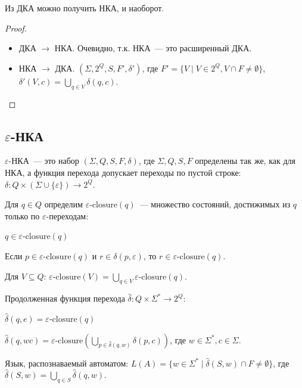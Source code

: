 \documentclass[12pt]{article}
\begin{document}
	\begin{statement}
		Из ДКА можно получить НКА, и наоборот.
	\end{statement}
	
	\begin{proof}
		\begin{itemize}
			\item ДКА $\rightarrow$ НКА. Очевидно, т.к. НКА~--- это расширенный ДКА.
			\item НКА $\rightarrow$ ДКА. $\left( \Sigma, 2^Q, S, F', \delta' \right)$, где $F' = \{ V \mid V \in 2^Q, V \cap F \neq \emptyset \}$, $\delta' (V, c) = \bigcup\limits_{q \in V} \delta(q, c)$.
		\end{itemize}
	\end{proof}
	
	\subsection{$\varepsilon$-НКА}
	
	\begin{definition}
		$\varepsilon$-НКА~--- это набор $(\Sigma, Q, S, F, \delta)$, где $\Sigma, Q, S, F$ определены так же, как для НКА, а функция перехода допускает переходы по пустой строке: $\delta: Q \times (\Sigma \cup \{ \varepsilon \}) \rightarrow 2^Q$.
	\end{definition}
	
	\begin{definition}
		Для $q \in Q$ определим $\varepsilon\text{-closure}(q)$~--- множество состояний, достижимых из $q$ только по $\varepsilon$-переходам:
		
		$q \in \varepsilon\text{-closure}(q)$
		
		Если $p \in \varepsilon\text{-closure}(q)$ и $r \in \delta(p, \varepsilon)$, то $r \in \varepsilon\text{-closure}(q)$.
		
		Для $V \subseteq Q$: $\varepsilon\text{-closure}(V) = \bigcup\limits_{q \in V} \varepsilon\text{-closure}(q)$.
	\end{definition}
	
	\begin{definition}
		Продолженная функция перехода $\hat\delta: Q \times \Sigma^* \rightarrow 2^Q$:
		
		$\hat\delta(q, e) = \varepsilon\text{-closure}(q)$
		
		$\hat\delta(q, wc) = \varepsilon\text{-closure}\left( \bigcup\limits_{p \in \hat\delta(q, w)} \delta(p, c) \right)$, где $w \in \Sigma^*, c \in \Sigma$.
		
		Язык, распознаваемый автоматом: $L(A) = \{ w \in \Sigma^* \mid \hat\delta(S, w) \cap F \neq \emptyset \}$, где $\hat\delta(S, w) = \bigcup\limits_{q \in S} \hat\delta(q, w)$.
	\end{definition}
	
\end{document}
